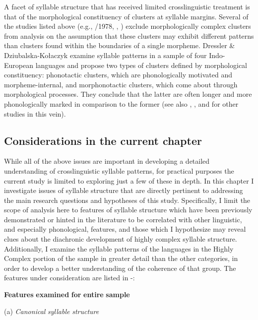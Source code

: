   A facet of syllable structure that has received limited crosslinguistic treatment is that of the morphological constituency of clusters at syllable margins. Several of the studies listed above (e.g., \citealt{Greenberg1965}/1978, \citealt{Morelli1999}, \citealt{Kreitman2008}) exclude morphologically complex clusters from analysis on the assumption that these clusters may exhibit different patterns than clusters found within the boundaries of a single morpheme. Dressler \& Dziubalska-Kołaczyk  examine syllable patterns in a sample of four Indo-European languages and propose two types of clusters defined by morphological constituency: phonotactic clusters, which are phonologically motivated and morpheme-internal, and morphonotactic clusters, which come about through morphological processes. They conclude that the latter are often longer and more phonologically marked in comparison to the former (see also \citealt{DresslerEtAl2010}, \citealt{Orzechowska2012}, and \citealt{DresslerEtAl2015} for other studies in this vein).

\subsection{Considerations in the current chapter}\label{sec:3.1.2}

  While all of the above issues are important in developing a detailed understanding of crosslinguistic syllable patterns, for practical purposes the current study is limited to exploring just a few of these in depth. In this chapter I investigate issues of syllable structure that are directly pertinent to addressing the main research questions and hypotheses of this study. Specifically, I limit the scope of analysis here to features of syllable structure which have been previously demonstrated or hinted in the literature to be correlated with other linguistic, and especially phonological, features, and those which I hypothesize may reveal clues about the diachronic development of highly complex syllable structure. Additionally, I examine the syllable patterns of the languages in the Highly Complex portion of the sample in greater detail than the other categories, in order to develop a better understanding of the coherence of that group. The features under consideration are listed in -:

\ea\label{ex:(3.1)}
   \textbf{Features} \textbf{examined} \textbf{for} \textbf{entire} \textbf{sample}

(a)   \textit{Canonical} \textit{syllable} \textit{structure}

